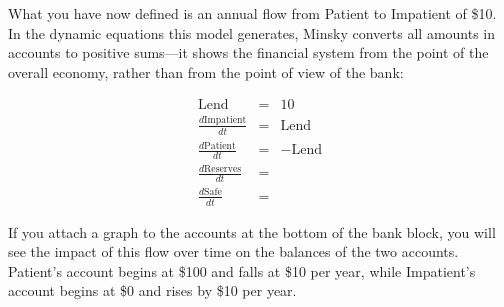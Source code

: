 What you have now defined is an annual flow from Patient to Impatient
of \$10. In the dynamic equations this model generates, Minsky converts
all amounts in accounts to positive sums---it shows the financial
system from the point of the overall economy, rather than from the
point of view of the bank:

\begin{eqnarray*}
\mathrm{Lend} & = & 10\\
\frac{d\mathrm{Impatient}}{dt} & = & \mathrm{Lend}\\
\frac{d\mathrm{Patient}}{dt} & = & -\mathrm{Lend}\\
\frac{d\mathrm{Reserves}}{dt} & =\\
\frac{d\mathrm{Safe}}{dt} & =
\end{eqnarray*}

If you attach a graph to the accounts at the bottom of the bank block,
you will see the impact of this flow over time on the balances of
the two accounts. Patient's account begins at \$100 and falls at \$10
per year, while Impatient's account begins at \$0 and rises by \$10
per year.
\begin{center}
\par\end{center}

